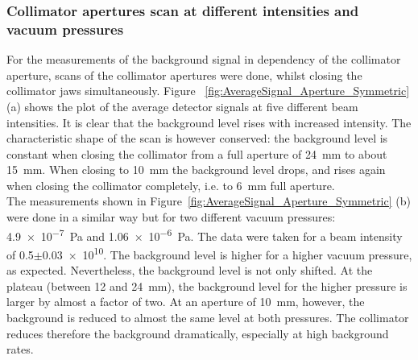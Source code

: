 \subsubsection{Collimator apertures scan at different intensities and vacuum pressures}
\label{aperture_scans}
For the measurements of the background signal in dependency of the collimator aperture, scans of the collimator apertures were done, whilst closing the collimator jaws simultaneously. 
Figure ~\ref{fig:AverageSignal_Aperture_Symmetric} (a) shows the plot of the average detector signals at five different beam intensities. 
It is clear that the background level rises with increased intensity. 
The characteristic shape of the scan is however conserved: 
the background level is constant when closing the collimator from a full aperture of \SI{24}{\milli\metre} to about \SI{15}{\milli\metre}. 
When closing to \SI{10}{\milli\metre} the background level drops, and rises again when closing the collimator completely, i.e. to \SI{6}{\milli\metre} full aperture. 
\\The measurements shown in Figure~\ref{fig:AverageSignal_Aperture_Symmetric} (b) were done in a similar way but for two different vacuum pressures: \SI{4.9e-7}{\pascal} and \SI{1.06e-6}{\pascal}. 
The data were taken for a beam intensity of \num{0.5}$\pm$\num{0.03e10}. 
The background level is higher for a higher vacuum pressure, as expected. 
Nevertheless, the background level is not only shifted. 
At the plateau (between 12 and \SI{24}{\milli\metre}), the background level for the higher pressure is larger by almost a factor of two.
At an aperture of \SI{10}{\milli\metre}, however, the background is reduced to almost the same level at both pressures. 
The collimator reduces therefore the background dramatically, especially at high background rates.

